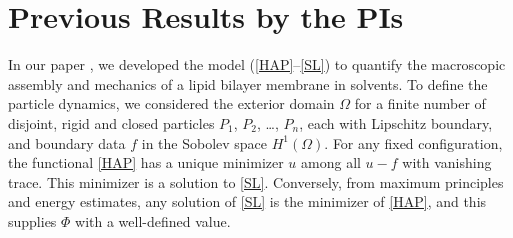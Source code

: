 \section{Previous Results by the PIs}
\label{sec:results}

In our paper \cite{Fu19}, we developed the model (\ref{HAP}--\ref{SL})
to quantify the macroscopic assembly and mechanics of a lipid bilayer membrane in solvents. 
To define the particle dynamics, we considered the exterior domain $\Omega$
for a finite number of disjoint, rigid and closed particles $P_1$, $P_2$, \dots, $P_n$, each with Lipschitz boundary,
and boundary data $f$ in the Sobolev space $H^1(\Omega).$ 
For any fixed configuration, the functional \eqref{HAP} has a unique minimizer $u$
among all $u - f$ with vanishing trace. This minimizer is a solution to \eqref{SL}.
Conversely, from maximum principles and energy estimates,  any solution of 
\eqref{SL} is the minimizer of \eqref{HAP}, and this supplies $\Phi$ with a well-defined value.

